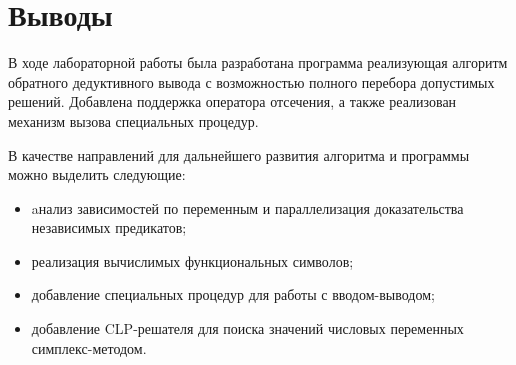 \chapter*{Выводы}

В ходе лабораторной работы была разработана программа реализующая алгоритм обратного дедуктивного вывода с возможностью полного перебора допустимых решений. Добавлена поддержка оператора отсечения, а также реализован механизм вызова специальных процедур.

В качестве направлений для дальнейшего развития алгоритма и программы можно выделить следующие:
\begin{itemize}[label=---]
  \item aнализ зависимостей по переменным и параллелизация доказательства независимых предикатов;
  \item реализация вычислимых функциональных символов;
  \item добавление специальных процедур для работы с вводом-выводом;
  \item добавление CLP-решателя для поиска значений числовых переменных симплекс-методом.
\end{itemize}
